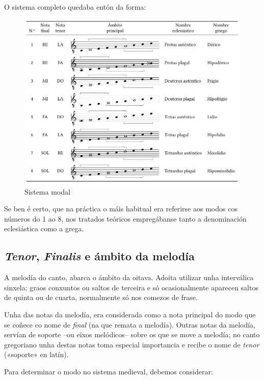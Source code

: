 \documentclass[a4paper, twoside]{templates/ociamthesis}
\begin{document}
O sistema completo quedaba entón da forma:

\begin{figure}
\centering
\includegraphics{figures/ud-03/sistema-modal.jpg}
\caption{Sistema modal}
\end{figure}

Se ben é certo, que na práctica o máis habitual era referirse aos modos cos números do 1 ao 8, nos tratados teóricos empregábanse tanto a denominación eclesiástica como a grega.

\hypertarget{tenor-finalis-e-uxe1mbito-da-meloduxeda}{%
\subsection{\texorpdfstring{\emph{Tenor}, \emph{Finalis} e ámbito da melodía}{Tenor, Finalis e ámbito da melodía}}\label{tenor-finalis-e-uxe1mbito-da-meloduxeda}}

A melodía do canto, abarca o ámbito da oitava. Adoita utilizar unha interválica sinxela; graos conxuntos ou saltos de terceira e só ocasionalmente aparecen saltos de quinta ou de cuarta, normalmente só nos comezos de frase.

Unha das notas da melodía, era considerada como a nota principal do modo que se coñece co nome de \emph{final} (na que remata a melodía). Outras notas da melodía, servían de soporte --ou eixos melódicos-- sobre os que se move a melodía; no canto gregoriano unha destas notas toma especial importancia e recibe o nome de \emph{tenor} («soporte» en latín).

Para determinar o modo no sistema medieval, debemos considerar:
\end{document}
